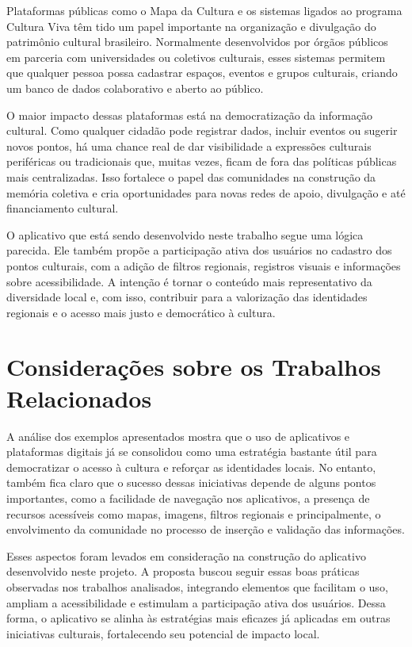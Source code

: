 Plataformas públicas como o Mapa da Cultura \cite{mapa_cultura} e os sistemas ligados ao programa Cultura Viva \cite{cultura_viva_programa} têm tido um papel importante na organização e divulgação do patrimônio cultural brasileiro. Normalmente desenvolvidos por órgãos públicos em parceria com universidades ou coletivos culturais, esses sistemas permitem que qualquer pessoa possa cadastrar espaços, eventos e grupos culturais, criando um banco de dados colaborativo e aberto ao público. \cite{prolam-cultura-viva-2025} \cite{nic-cultura-tecnologias-no-brasil}

O maior impacto dessas plataformas está na democratização da informação cultural. Como qualquer cidadão pode registrar dados, incluir eventos ou sugerir novos pontos, há uma chance real de dar visibilidade a expressões culturais periféricas ou tradicionais que, muitas vezes, ficam de fora das políticas públicas mais centralizadas. Isso fortalece o papel das comunidades na construção da memória coletiva e cria oportunidades para novas redes de apoio, divulgação e até financiamento cultural.

O aplicativo que está sendo desenvolvido neste trabalho segue uma lógica parecida. Ele também propõe a participação ativa dos usuários no cadastro dos pontos culturais, com a adição de filtros regionais, registros visuais e informações sobre acessibilidade. A intenção é tornar o conteúdo mais representativo da diversidade local e, com isso, contribuir para a valorização das identidades regionais e o acesso mais justo e democrático à cultura.

\section{Considerações sobre os Trabalhos Relacionados}

A análise dos exemplos apresentados mostra que o uso de aplicativos e plataformas digitais já se consolidou como uma estratégia bastante útil para democratizar o acesso à cultura e reforçar as identidades locais. No entanto, também fica claro que o sucesso dessas iniciativas depende de alguns pontos importantes, como a facilidade de navegação nos aplicativos, a presença de recursos acessíveis como mapas, imagens, filtros regionais e principalmente, o envolvimento da comunidade no processo de inserção e validação das informações.

Esses aspectos foram levados em consideração na construção do aplicativo desenvolvido neste projeto. A proposta buscou seguir essas boas práticas observadas nos trabalhos analisados, integrando elementos que facilitam o uso, ampliam a acessibilidade e estimulam a participação ativa dos usuários. Dessa forma, o aplicativo se alinha às estratégias mais eficazes já aplicadas em outras iniciativas culturais, fortalecendo seu potencial de impacto local.